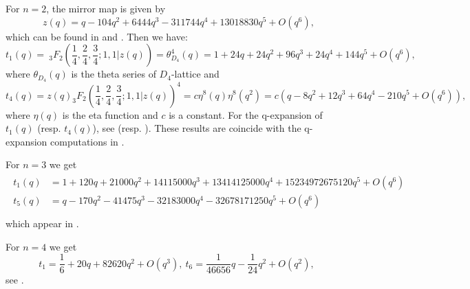 \documentclass[11pt,leqno]{article}
\theoremstyle{remark}
\theoremstyle{definition}
\begin{document}
For $n=2$, the mirror map is given by
\[
z(q) = q-104q^2+6444q^3-311744q^4+13018830q^5 + O(q^6),
\]
which can be found in \cite[(7.3.7)]{Gannon2023} and \cite[A286329]{oeis}.  Then we have:
$$
t_1(q)=\ _3F_2(\frac{1}{4},\frac{2}{4}, \frac{3}{4};1,1| z(q)) =  \theta_{D_4}^4(q) = 1+24q+24q^2+96q^3+24q^4+144q^5+O(q^6),   
$$
where $\theta_{D_4}(q)$ is the theta series of $D_4$-lattice and 
$$
t_4(q) = z(q) _3F_2(\frac{1}{4},\frac{2}{4}, \frac{3}{4};1,1| z(q))^4 = c \eta^8(q) \eta^8(q^2) = c(q-8q^2+12q^3+64q^4-210q^5+O(q^6)),
$$
where $\eta(q)$ is the eta function and $c$ is a constant. %
For the q-expansion of $t_1(q)$ (resp. $t_4(q)$), see \cite[A004011]{oeis} (resp. \cite[A002288]{oeis}). These results are coincide with the q-expansion computations in \cite{GMCD-DF}. 
\

For $n=3$ we get
\begin{align}
    \begin{split}
        t_1(q)&=1+120 q+21000 q^2+14115000 q^3+13414125000 q^4+15234972675120
   q^5+O\left(q^6\right)\\
   t_5(q) &= q-170 q^2-41475 q^3-32183000 q^4-32678171250 q^5+O\left(q^6\right)\\
    \end{split}
\end{align}
which appear in \cite{GMCD-MQCY3}. 

For $n=4$ we get 
$$
t_1=\frac{1}{6}+20q+82620q^2+O(q^3),\   t_6=\frac{1}{46656}q-\frac{1}{24}q^2 + O(q^2),\ \ 
$$
see \cite[Section 8.3]{GMCD-DF}.%
\end{document}
